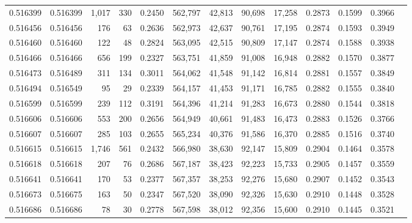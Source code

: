 \begin{tabular}{rrrrrrrrrrrrr}
0.516399 & 0.516399 & 1,017 &   330 &                                     0.2450 & 562,797 &  42,813 &  90,698 &  17,258 & 0.2873 & 0.1599 & 0.3966 \\
0.516456 & 0.516456 &   176 &    63 &                                     0.2636 & 562,973 &  42,637 &  90,761 &  17,195 & 0.2874 & 0.1593 & 0.3949 \\
0.516460 & 0.516460 &   122 &    48 &                                     0.2824 & 563,095 &  42,515 &  90,809 &  17,147 & 0.2874 & 0.1588 & 0.3938 \\
0.516466 & 0.516466 &   656 &   199 &                                     0.2327 & 563,751 &  41,859 &  91,008 &  16,948 & 0.2882 & 0.1570 & 0.3877 \\
0.516473 & 0.516489 &   311 &   134 &                                     0.3011 & 564,062 &  41,548 &  91,142 &  16,814 & 0.2881 & 0.1557 & 0.3849 \\
0.516494 & 0.516549 &    95 &    29 &                                     0.2339 & 564,157 &  41,453 &  91,171 &  16,785 & 0.2882 & 0.1555 & 0.3840 \\
0.516599 & 0.516599 &   239 &   112 &                                     0.3191 & 564,396 &  41,214 &  91,283 &  16,673 & 0.2880 & 0.1544 & 0.3818 \\
0.516606 & 0.516606 &   553 &   200 &                                     0.2656 & 564,949 &  40,661 &  91,483 &  16,473 & 0.2883 & 0.1526 & 0.3766 \\
0.516607 & 0.516607 &   285 &   103 &                                     0.2655 & 565,234 &  40,376 &  91,586 &  16,370 & 0.2885 & 0.1516 & 0.3740 \\
0.516615 & 0.516615 & 1,746 &   561 &                                     0.2432 & 566,980 &  38,630 &  92,147 &  15,809 & 0.2904 & 0.1464 & 0.3578 \\
0.516618 & 0.516618 &   207 &    76 &                                     0.2686 & 567,187 &  38,423 &  92,223 &  15,733 & 0.2905 & 0.1457 & 0.3559 \\
0.516641 & 0.516641 &   170 &    53 &                                     0.2377 & 567,357 &  38,253 &  92,276 &  15,680 & 0.2907 & 0.1452 & 0.3543 \\
0.516673 & 0.516675 &   163 &    50 &                                     0.2347 & 567,520 &  38,090 &  92,326 &  15,630 & 0.2910 & 0.1448 & 0.3528 \\
0.516686 & 0.516686 &    78 &    30 &                                     0.2778 & 567,598 &  38,012 &  92,356 &  15,600 & 0.2910 & 0.1445 & 0.3521 \\

\end{tabular}
